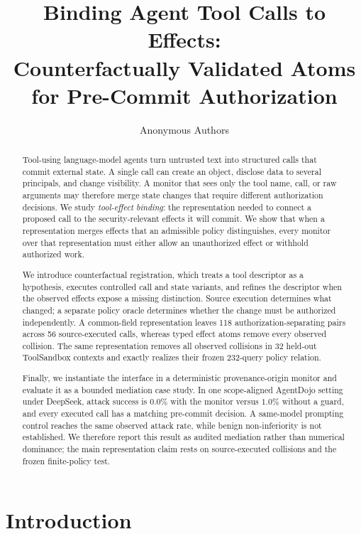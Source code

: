 \documentclass[letterpaper,twocolumn,10pt]{article}
\title{Binding Agent Tool Calls to Effects:\\ Counterfactually Validated Atoms for Pre-Commit Authorization}
\author{Anonymous Authors}
\date{}
\theoremstyle{definition}
\begin{document}
\maketitle
\begin{abstract}
Tool-using language-model agents turn untrusted text into structured calls that
commit external state.  A single call can create an object, disclose data to
several principals, and change visibility.  A monitor that sees only the tool
name, call, or raw arguments may therefore merge state changes that require
different authorization decisions.  We study \emph{tool-effect binding}: the
representation needed to connect a proposed call to the security-relevant
effects it will commit.  We show that when a representation merges effects
that an admissible policy distinguishes, every monitor over that representation
must either allow an unauthorized effect or withhold authorized work.

We introduce counterfactual registration, which treats a tool descriptor as a
hypothesis, executes controlled call and state variants, and refines the
descriptor when the observed effects expose a missing distinction.  Source
execution determines what changed; a separate policy oracle determines whether
the change must be authorized independently.  A common-field representation
leaves 118 authorization-separating pairs across 56 source-executed calls,
whereas typed effect atoms remove every observed collision.  The same
representation removes all observed collisions in 32 held-out ToolSandbox
contexts and exactly realizes their frozen 232-query policy relation.

Finally, we instantiate the interface in a deterministic provenance-origin
monitor and evaluate it as a bounded mediation case study.  In one
scope-aligned AgentDojo setting under DeepSeek, attack success is $0.0\%$
with the monitor versus $1.0\%$ without a guard, and every executed call has
a matching pre-commit decision.  A same-model prompting control reaches the
same observed attack rate, while benign non-inferiority is not established.
We therefore report this result as audited mediation rather than numerical
dominance; the main representation claim rests on source-executed collisions
and the frozen finite-policy test.
\end{abstract}

\section{Introduction}
\label{sec:introduction}
\end{document}
